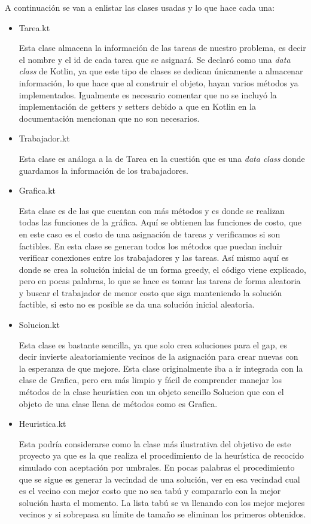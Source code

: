 \documentclass{article}
\begin{document}
A continuación se van a enlistar las clases usadas y lo que hace cada una:
\begin{itemize}
	\item {Tarea.kt
		
		Esta clase almacena la información de las tareas de nuestro problema, es decir el nombre y el id de cada tarea que se asignará. Se declaró como una \emph{data class} de Kotlin, ya que este tipo de clases se dedican únicamente a almacenar información, lo que hace que al construir el objeto, hayan varios métodos ya implementados. Igualmente es necesario comentar que no se incluyó la implementación de getters y setters debido a que en Kotlin en la documentación mencionan que no son necesarios.
	}
	\item {Trabajador.kt
		
		Esta clase es análoga a la de Tarea en la cuestión que es una \emph{data class} donde guardamos la información de los trabajadores.
	}
	\item {Grafica.kt
		
		Esta clase es de las que cuentan con más métodos y es donde se realizan todas las funciones de la gráfica. Aquí se obtienen las funciones de costo, que en este caso es el costo de una asignación de tareas y verificamos si son factibles. En esta clase se generan todos los métodos que puedan incluir verificar conexiones entre los trabajadores y las tareas. Así mismo aquí es donde se crea la solución inicial de un forma greedy, el código viene explicado, pero en pocas palabras, lo que se hace es tomar las tareas de forma aleatoria y buscar el trabajador de menor costo que siga manteniendo la solución factible, si esto no es posible se da una solución inicial aleatoria.
	}
	\item {Solucion.kt
		
		Esta clase es bastante sencilla, ya que solo crea soluciones para el gap, es decir invierte aleatoriamiente vecinos de la asignación para crear nuevas con la esperanza de que mejore. Esta clase originalmente iba a ir integrada con la clase de Grafica, pero era más limpio y fácil de comprender manejar los métodos de la clase heurística con un objeto sencillo Solucion que con el objeto de una clase llena de métodos como es Grafica.
	
	}
	\item {Heuristica.kt
		
		Esta podría considerarse como la clase más ilustrativa del objetivo de este proyecto ya que es la que realiza el procedimiento de la heurística de recocido simulado con aceptación por umbrales. En pocas palabras el procedimiento que se sigue es generar la vecindad de una solución, ver en esa vecindad cual es el vecino con mejor costo que no sea tabú y compararlo con la mejor solución hasta el momento. La lista tabú se va llenando con los mejor mejores vecinos y si sobrepasa su límite de tamaño se eliminan los primeros obtenidos.
	
}
\end{itemize}
\end{document}
